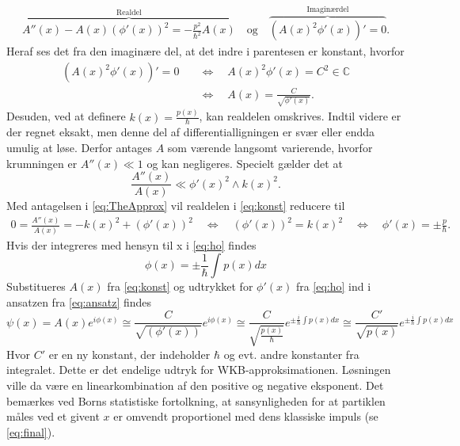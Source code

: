 \begin{align}
    \overbrace{A''(x) - A(x)\left( \phi'(x) \right)^{2} = - \frac{p^{2}}{\hbar^{2}}A(x)}^{\text{Realdel}} \quad \text{og} \quad%
    \overbrace{\left( A(x)^{2}\phi'(x) \right)' = 0}^{\text{Imaginærdel}}.
    \label{eq:realogimag}
\end{align}
Heraf ses det fra den imaginære del, at det indre i parentesen er konstant, hvorfor
\begin{align}
    \left( A(x)^{2}\phi'(x) \right)' = 0  \quad & \Leftrightarrow  \quad A(x)^{2}\phi'(x) = C^{2} \in \mathbb{C} \\
    & \Leftrightarrow  \quad A(x) = \frac{C}{\sqrt{\phi'(x)}}.
    \label{eq:konst}
\end{align}
Desuden, ved at definere $k(x) = \frac{p(x)}{\hbar}$, kan realdelen omskrives. Indtil videre er der regnet eksakt, men denne del af differentialligningen er svær eller endda umulig at løse. Derfor antages $A$ som værende langsomt varierende, hvorfor krumningen er $A''(x)\ll 1$ og kan  negligeres.
Specielt gælder det at
\begin{equation}
  \frac{A''(x)}{A(x)} \ll \phi'(x)^{2}\wedge k(x)^2.
  \label{eq:TheApprox}
\end{equation}
Med antagelsen i \cref{eq:TheApprox} vil realdelen i \cref{eq:konst} reducere til
\begin{align}
    0 = \frac{A''(x)}{A(x)} = -k(x)^{2} + (\phi'(x))^{2}
    \quad \Leftrightarrow\quad  \left(\phi'(x)\right)^{2} = k(x)^{2} \quad \Leftrightarrow \quad  \phi'(x) = \pm \frac{p}{\hbar}.
    \label{eq:ho}
\end{align}
Hvis der integreres med hensyn til x i \cref{eq:ho} findes
%
\begin{equation}
    \phi(x) = \pm \frac{1}{\hbar} \int p(x) dx
    \label{eq:thisPhi}
\end{equation}
%
Substitueres $A(x)$ fra \cref{eq:konst} og udtrykket for $\phi{'\left (x \right )}$ fra \cref{eq:ho}  ind i ansatzen fra \cref{eq:ansatz} findes
%
\begin{equation}
    \psi(x) = A(x) e^{i \phi(x)} \cong
    \frac{C}{\sqrt{( \phi{'\left (x \right )})}} e^{i \phi(x)} \cong
    \frac{C}{\sqrt{\frac{p(x)}{\hbar}}} e^{\pm \frac{i}{\hbar} \int p(x) dx} \cong
    \frac{C'}{\sqrt{p(x)}} e^{\pm \frac{i}{\hbar} \int p(x) dx}
    \label{eq:final}
\end{equation}
%
Hvor $C'$ er en ny konstant, der indeholder $\hbar$ og evt. andre konstanter fra integralet. Dette er det endelige udtryk for WKB-approksimationen. Løsningen ville da være en linearkombination af den positive og negative eksponent. Det bemærkes ved Borns statistiske fortolkning, at sansynligheden for at partiklen måles ved et givent $x$ er omvendt proportionel med dens klassiske impuls (se \cref{eq:final}).
